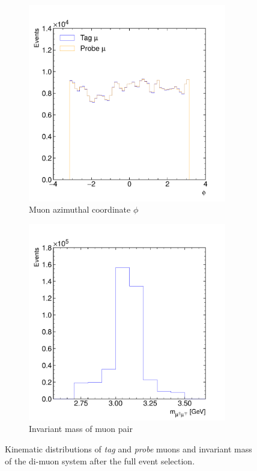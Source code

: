\begin{figure}[htbp]
	\begin{subfigure}[b]{0.45\textwidth}
		\centering
		\includegraphics[width=0.95\textwidth]{figures/muontrigger/l1mu4/l1mu4_muon_phi.pdf}
		\caption{Muon azimuthal coordinate \(\phi\)}
	\end{subfigure}
	\begin{subfigure}[b]{0.45\textwidth}
		\centering
		\includegraphics[width=0.95\textwidth]{figures/muontrigger/l1mu4/l1mu4_dimuon_mass.pdf}
		\caption{Invariant mass of muon pair}
	\end{subfigure}

	\caption{Kinematic distributions of \emph{tag} and \emph{probe} muons and invariant mass of the di-muon system after the full event selection.}
	\label{fig:trigger:l1mu4:kinematics}
\end{figure}



